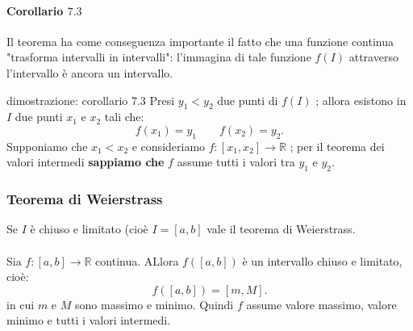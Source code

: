 \documentclass[x11names]{article}
\begin{document}
\paragraph{Corollario $7.3$}
Il teorema ha come conseguenza importante il fatto che una funzione continua "trasforma intervalli in intervalli": l'immagina di tale funzione $f\left(I\right)$ attraverso l'intervallo è ancora un intervallo.

\begin{es}{dimostrazione: corollario 7.3}
Presi $y_1 < y_2$ due punti di $f\left(I\right)$ ; allora esistono in $I$ due punti $x_1$ e $x_2$ tali che:
\[
f\left(x_1\right) = y_1 \qquad f\left(x_2\right) = y_2
.\] 
Supponiamo che $x_1 < x_2$ e consideriamo $f:\left[x_1,x_2\right] \rightarrow \mathbb{R}$ ; per il teorema dei valori intermedi \textbf{sappiamo che} $f$ assume tutti i valori tra $y_1$ e $y_2$.
\end{es}


\begin{center}
\colorbox{myred}{\begin{minipage}{5.75in}
\begin{redes}{}
\subsubsection{Teorema di Weierstrass}
Se $I$ è chiuso e limitato (cioè $I=\left[a,b\right]$ vale il teorema di Weierstrass.
\\ \\
Sia $f:\left[a,b\right] \rightarrow \mathbb{R}$ continua. ALlora $f\left(\left[a,b\right]\right)$ è un intervallo chiuso e limitato, cioè:
 \[
f\left(\left[a,b\right]\right) = \left[m,M\right]
.\] 
in cui $m$ e $M$ sono massimo e minimo. Quindi $f$ assume valore massimo, valore minimo e tutti i valori intermedi.
\end{redes}
\end{minipage}}        
\end{center}



\newpage
\end{document}
